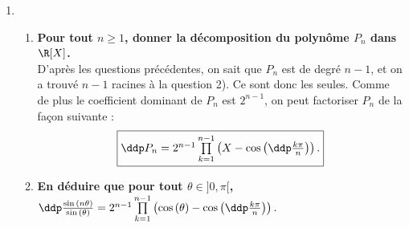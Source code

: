 \documentclass[a4paper, 11pt,reqno]{article}
\begin{document}
\begin{correction}
\begin{enumerate}
		      Montrons par double r\'ecurrence sur $n \in \N^*$ la propri\'et\'e suivante : $H_n : P_n$ est un polyn\^ome de degr\'e $n-1$ et de coefficient dominant $2^{n-1}$.\\
		      \begin{itemize}
			      \item[$\bullet$] Initialisation : on a $P_1= 1$, qui est bien un polyn\^ome de degr\'e $0$ et de coefficient dominant $2^0=1$. De m\^eme, $P_2 = 2X$ est un polyn\^ome de degr\'e $1$ et de coefficient dominant $2^1=2$.  \\
			      \item[$\bullet$] H\'er\'edit\'e : soit $n\in \N^*$ fix\'e, supposons $H_n$ et $H_{n+1}$ vraies. Montrons que $H_{n+2}$ est vraie. On a
			            $$P_{n+2}  =  2 X P_{n+1} - P_{n},$$
			            donc $P_{n+2}$ est un polyn\^ome comme produit et somme de polyn\^omes. De plus, par hypoth\`ese de r\'ecurrence, il existe $Q$ (respectivement $R$ de degr\'e inf\'erieur ou \'egal \`a $n-1$ (respectivement $n-2$) tels que $P_{n+1} =  2^{n} X^{n} +Q$ et $P_n = 2^{n-1} X^{n-1} + R$. Donc on a
			            $$P_{n+2}  =  2 X  (2^{n} X^{n} +Q) - 2^{n-1} X^{n-1} - R,$$
			            soit
			            $$P_{n+2} =   2^{n+1} X^{n+1} + S$$
			            avec $S = 2X Q  - 2^{n-1} X^{n-1} - R$ un polyn\^ome de degr\'e inf\'erieur ou \'egal \`a $n$. Donc $P_{n+2}$ est bien de degr\'e $n+1$ et de coefficient dominant \'egal \`a $2^{n+1}$, et $H_{n +2}$ est d\'emontr\'ee.
		      \end{itemize}
		      Par principe de r\'ecurrence, la propri\'et\'e $H_n$ est vraie pour tout $n \in \N^*$ : .
		\item
		      \begin{enumerate}
			      \item \textbf{Pour tout $n\geq 1$, donner la d\'ecomposition du polyn\^ome $P_n$ dans $\R\lbrack X\rbrack$.}\\
			            D'apr\`es les questions pr\'ec\'edentes, on sait que $P_n$ est de degr\'e $n-1$, et on a trouv\'e $n-1$ racines \`a la question 2). Ce sont donc les seules. Comme de plus le coefficient dominant de $P_n$ est $2^{n-1}$, on peut factoriser $P_n$ de la fa\c con suivante :
			            $$\fbox{$\ddp P_n = 2^{n-1}\prod\limits_{k=1}^{n-1}\left( X-\cos{\left( \ddp\frac{k\pi}{n}\right) } \right).$}$$
			      \item \textbf{En d\'eduire que pour tout $\theta\in\rbrack 0,\pi\lbrack$, $\ddp\frac{\sin{(n\theta)}}{\sin{(\theta)}}=2^{n-1}\prod\limits_{k=1}^{n-1}\left( \cos{(\theta)}-\cos{\left( \ddp\frac{k\pi}{n}\right) } \right).$}\\

\end{enumerate}
\end{enumerate}
\end{correction}
\end{document}
